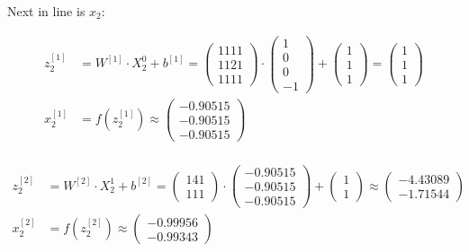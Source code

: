 \documentclass[12pt]{article}
\begin{document}
\begin{enumerate}[leftmargin=\labelsep]
          Next in line is $x_2$:

          \begin{align*}
            z^{[1]}_2 &= {W}^{[1]} \cdot {X}^{0}_2 + {b}^{[1]} = \begin{pmatrix} 1 1 1 1 \\ 1 1 2 1 \\ 1 1 1 1\end{pmatrix} \cdot  \begin{pmatrix} 1 \\ 0 \\ 0 \\ -1 \end{pmatrix} +
             \begin{pmatrix} 1 \\ 1 \\ 1\end{pmatrix} = \begin{pmatrix} 1 \\ 1 \\ 1\end{pmatrix} \\
            {x}^{[1]}_2 &= f({z}^{[1]}_2) \approx \begin{pmatrix} -0.90515 \\ -0.90515 \\ -0.90515\end{pmatrix} \\
          \end{align*}

          \begin{align*}
            z^{[2]}_2 &= {W}^{[2]} \cdot {X}^{1}_2 + {b}^{[2]} = \begin{pmatrix} 1 4 1 \\ 1 1 1\end{pmatrix} \cdot  \begin{pmatrix} -0.90515 \\ -0.90515 \\ -0.90515 \end{pmatrix} +
            \begin{pmatrix} 1 \\ 1\end{pmatrix} \approx \begin{pmatrix} -4.43089 \\ -1.71544\end{pmatrix} \\
            {x}^{[2]}_2 &= f({z}^{[2]}_2) \approx \begin{pmatrix} -0.99956 \\ -0.99343\end{pmatrix} \\
          \end{align*}


\end{enumerate}
\end{document}
